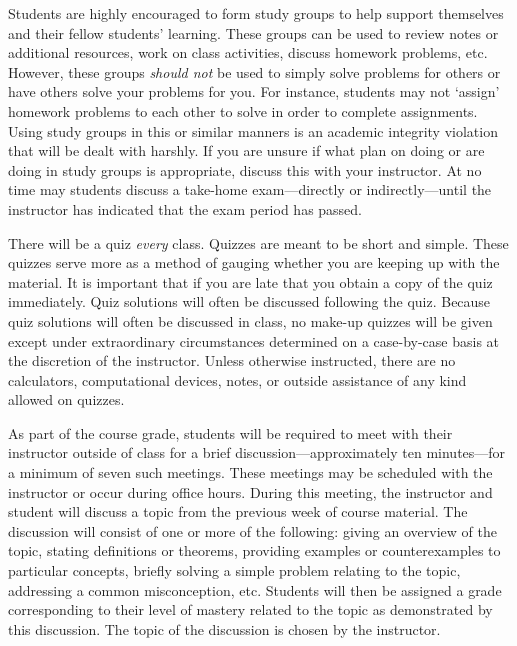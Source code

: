 \documentclass[11pt,letterpaper]{article}
\begin{document}
Students are highly encouraged to form study groups to help support themselves and their fellow students' learning. These groups can be used to review notes or additional resources, work on class activities, discuss homework problems, etc. However, these groups {\itshape should not} be used to simply solve problems for others or have others solve your problems for you. For instance, students may not `assign' homework problems to each other to solve in order to complete assignments. Using study groups in this or similar manners is an academic integrity violation that will be dealt with harshly. If you are unsure if what plan on doing or are doing in study groups is appropriate, discuss this with your instructor. At no time may students discuss a take-home exam---directly or indirectly---until the instructor has indicated that the exam period has passed. \pvspace{0.3cm}



There will be a quiz \textit{every} class. Quizzes are meant to be short and simple. These quizzes serve more as a method of gauging whether you are keeping up with the material. It is important that if you are late that you obtain a copy of the quiz immediately. Quiz solutions will often be discussed following the quiz. Because quiz solutions will often be discussed in class, no make-up quizzes will be given except under extraordinary circumstances determined on a case-by-case basis at the discretion of the instructor. Unless otherwise instructed, there are no calculators, computational devices, notes, or outside assistance of any kind allowed on quizzes. \pspace



As part of the course grade, students will be required to meet with their instructor outside of class for a brief discussion---approximately ten minutes---for a minimum of seven such meetings. These meetings may be scheduled with the instructor or occur during office hours. During this meeting, the instructor and student will discuss a topic from the previous week of course material. The discussion will consist of one or more of the following: giving an overview of the topic, stating definitions or theorems, providing examples or counterexamples to particular concepts, briefly solving a simple problem relating to the topic, addressing a common misconception, etc. Students will then be assigned a grade corresponding to their level of mastery related to the topic as demonstrated by this discussion. The topic of the discussion is chosen by the instructor. \pspace
\end{document}
